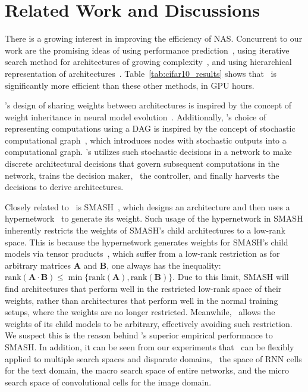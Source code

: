 \section{\label{sec:related}Related Work and Discussions}
There is a growing interest in improving the efficiency of NAS. Concurrent to our work are the promising ideas of using performance prediction~\citep{nas_performance_pred,nas_peephole}, using iterative search method for architectures of growing complexity~\citep{pnas}, and using hierarchical representation of architectures~\citep{hierarchical_nas}. Table~\ref{tab:cifar10_results} shows that \enas~is significantly more efficient than these other methods, in GPU hours.

\enas's design of sharing weights between architectures is inspired by the concept of weight inheritance in neural model evolution~\citep{nas_evolution,nas_reg_evolution}. Additionally, \enas's choice of representing computations using a DAG is inspired by the concept of stochastic computational graph~\citep{stochastic_computation}, which introduces nodes with stochastic outputs into a computational graph. \enas's utilizes such stochastic decisions in a network to make discrete architectural decisions that govern subsequent computations in the network, trains the decision maker, \ie~the controller, and finally harvests the decisions to derive architectures.

Closely related to \enas~is SMASH~\citep{smash_net}, which designs an architecture and then uses a hypernetwork~\citep{hyper_net} to generate its weight. Such usage of the hypernetwork in SMASH inherently restricts the weights of SMASH's child architectures to a low-rank space. This is because the hypernetwork generates weights for SMASH's child models via tensor products~\citep{hyper_net}, which suffer from a low-rank restriction as for arbitrary matrices $\mathbf{A}$ and $\mathbf{B}$, one always has the inequality: $\text{rank}(\mathbf{A} \cdot \mathbf{B}) \leq \min{\{\text{rank}(\mathbf{A}), \text{rank}(\mathbf{B})\}}$. Due to this limit, SMASH will find architectures that perform well in the restricted low-rank space of their weights, rather than architectures that perform well in the normal training setups, where the weights are no longer restricted. Meanwhile, \enas~allows the weights of its child models to be arbitrary, effectively avoiding such restriction. We suspect this is the reason behind \enas's superior empirical performance to SMASH. In addition, it can be seen from our experiments that \enas~can be flexibly applied to multiple search spaces and disparate domains, \eg~the space of RNN cells for the text domain, the macro search space of entire networks, and the micro search space of convolutional cells for the image domain.
